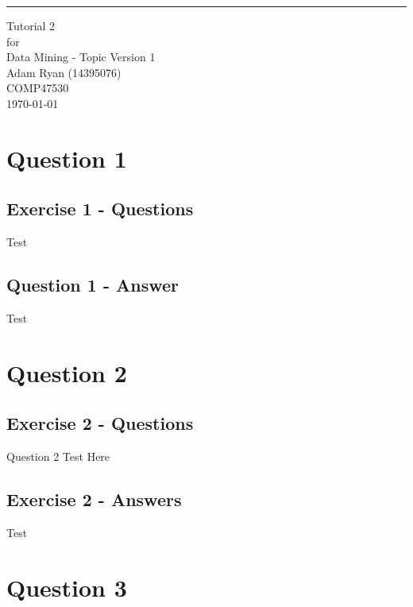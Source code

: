 \documentclass{scrreprt}
\date{}
\def\myversion{1 }
\begin{document}
	
	\begin{flushright}
		\rule{16cm}{5pt}\vskip1cm
		\begin{bfseries}
			\Huge{Tutorial 2\\}
			\vspace{1.9cm}
			for\\
			\vspace{1.9cm}
			Data Mining - Topic
			\vspace{1.9cm}
			\LARGE{Version \myversion}\\
			\vspace{1.9cm}
			Adam Ryan (14395076)\\
			\vspace{1.9cm}
			COMP47530\\
			\vspace{1.9cm}
			\today\\
		\end{bfseries}
	\end{flushright}
	
	\tableofcontents

	
\chapter{Question 1}
\section{Exercise 1 - Questions}\label{E1Q}
Test

	
\section{Question 1 - Answer}\label{E1A}
Test


\newpage
\chapter{Question 2}
\section{Exercise 2 - Questions}\label{E2Q}
Question 2 Test Here


\section{Exercise 2 - Answers}\label{E2A}
Test
	
\newpage	
\chapter{Question 3}
\end{document}
